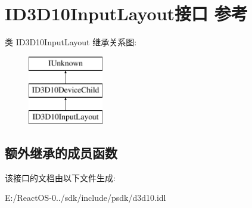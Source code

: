 \hypertarget{interface_i_d3_d10_input_layout}{}\section{I\+D3\+D10\+Input\+Layout接口 参考}
\label{interface_i_d3_d10_input_layout}
类 I\+D3\+D10\+Input\+Layout 继承关系图\+:\begin{figure}[H]
\begin{center}
\leavevmode
\includegraphics[height=3.000000cm]{interface_i_d3_d10_input_layout}
\end{center}
\end{figure}
\subsection*{额外继承的成员函数}


该接口的文档由以下文件生成\+:\begin{DoxyCompactItemize}
\item 
E\+:/\+React\+O\+S-\/0../sdk/include/psdk/d3d10.\+idl\end{DoxyCompactItemize}
